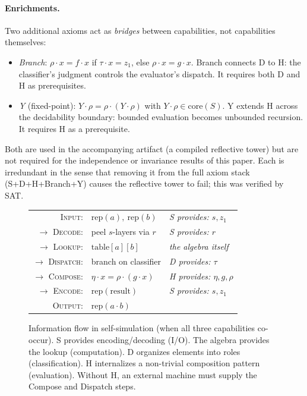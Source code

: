 \documentclass[sigconf,screen,review,anonymous]{acmart}
\newcommand{\dotop}{\cdot}
\newcommand{\core}{\mathrm{core}}
\begin{document}
\paragraph{Enrichments.}
Two additional axioms act as \emph{bridges} between capabilities, not capabilities themselves:
\begin{itemize}
  \item \emph{Branch}: $\rho \dotop x = f \dotop x$ if $\tau \dotop x = z_1$, else $\rho \dotop x = g \dotop x$. Branch connects D to H: the classifier's judgment controls the evaluator's dispatch. It requires both D and H as prerequisites.
  \item \emph{Y} (fixed-point): $Y \dotop \rho = \rho \dotop (Y \dotop \rho)$ with $Y \dotop \rho \in \core(S)$. Y extends H across the decidability boundary: bounded evaluation becomes unbounded recursion. It requires H as a prerequisite.
\end{itemize}
Both are used in the accompanying artifact (a compiled reflective tower) but are not required for the independence or invariance results of this paper. Each is irredundant in the sense that removing it from the full axiom stack (S+D+H+Branch+Y) causes the reflective tower to fail; this was verified by SAT.

\begin{figure}[t]
\centering
\begin{tabular}{@{}r@{~}l@{\quad}l@{}}
\textsc{Input}: & $\text{rep}(a),\ \text{rep}(b)$ & \emph{S provides: $s, z_1$} \\
$\to$ \textsc{Decode}: & peel $s$-layers via $r$ & \emph{S provides: $r$} \\
$\to$ \textsc{Lookup}: & $\text{table}[a][b]$ & \emph{the algebra itself} \\
$\to$ \textsc{Dispatch}: & branch on classifier & \emph{D provides: $\tau$} \\
$\to$ \textsc{Compose}: & $\eta \dotop x = \rho \dotop (g \dotop x)$ & \emph{H provides: $\eta, g, \rho$} \\
$\to$ \textsc{Encode}: & $\text{rep}(\text{result})$ & \emph{S provides: $s, z_1$} \\
\textsc{Output}: & $\text{rep}(a \dotop b)$ & \\
\end{tabular}
\caption{Information flow in self-simulation (when all three capabilities co-occur). S provides encoding/decoding (I/O). The algebra provides the lookup (computation). D organizes elements into roles (classification). H internalizes a non-trivial composition pattern (evaluation). Without H, an external machine must supply the Compose and Dispatch steps.}
\label{fig:flow}
\end{figure}
\end{document}
